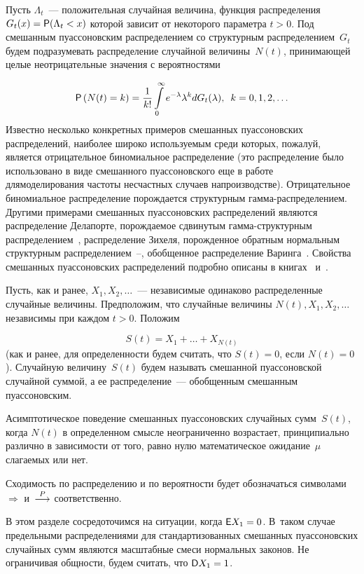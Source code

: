 \begin{multicols}{2}
Пусть $\Lambda_t$~--- положительная случайная величина, функция
распределения $G_t(x)={\sf P}(\Lambda_t<x)$ которой зависит от
некоторого параметра $t>0$. Под смешанным пуассоновским
распределением со структурным распределением~$G_t$ будем
подразумевать распределение случайной величины~$N(t)$, принимающей
целые неотрицательные значения с вероятностями

\noindent
$$
{\sf P}\left(N(t)=k\right)=\displaystyle\frac{\displaystyle 1\mathstrut}{\displaystyle k!\mathstrut}\int\limits_{0}^{\infty}
e^{-\lambda}\lambda^kdG_t(\lambda),\enskip k=0,1,2,\ldots
$$
Известно несколько конкретных примеров смешанных пуассоновских
распределений, наиболее широко используемым среди которых, пожалуй,
является отрицательное биномиальное распределение (это распределение
было использовано в виде смешанного пуассоновского еще в работе~\cite{Greenwood1920} 
для\linebreak моделирования частоты несчастных
случаев на\linebreak производстве). Отрицательное биномиальное распределение
порождается структурным гам\-ма-рас\-пре\-де\-ле\-ни\-ем. Другими примерами
смешанных пуассоновских распределений являются распределение
Делапорте, порождаемое сдвинутым гам\-ма-струк\-тур\-ным распределением~\cite{Delaporte}, 
распределение Зихеля, порожденное
обратным нормальным структурным распределением~\cite{Holla}--\cite{Willmot}, обобщенное
распределение Варинга~\cite{Irwin, Seal}. Свойства смешанных пуассоновских
распределений подробно описаны в книгах~\cite{Grandell} и~\cite{BenKor2002}.

Пусть, как и ранее, $X_1,X_2,\ldots$~--- независимые одинаково
распределенные случайные величины. Предположим, что случайные
величины $N(t),X_1,X_2,\ldots$ независимы при каждом $t>0$. Положим

\noindent
$$
S(t)=X_1+ \ldots +X_{N(t)}
$$
(как и ранее, для определенности будем считать, что $S(t)=0$, если
$N(t)=0$). Случайную величину~$S(t)$ будем называть смешанной
пуассоновской случайной суммой, а ее распределение~--- обобщенным
смешанным пуассоновским.

Асимптотическое поведение смешанных пуассоновских случайных сумм~$S(t)$, когда $N(t)$ 
в определенном смысле неограниченно
возрастает, принципиально различно в зависимости от того, равно
нулю математическое ожидание~$\mu$ слагаемых или нет.

Сходимость по распределению и по вероятности будет обозначаться
символами $\Longrightarrow$ и~$\stackrel{P}{\longrightarrow}$ соответственно.

В этом разделе сосредоточимся на ситуации, когда ${\sf E}X_1=0$. 
В~таком случае предельными распределениями для стандартизованных
смешанных пуассоновских случайных сумм являются масштабные смеси
нормальных законов. Не ограничивая общности, будем считать, что
${\sf D}X_1=1$.


\end{multicols}
